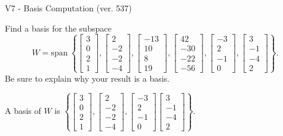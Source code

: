 \begin{exercise}
  \begin{exerciseTitle}V7 - Basis Computation (ver. 537)\end{exerciseTitle}
  \begin{exerciseStatement}
    Find a basis for the subspace 
\[W=\mathrm{span}\ \left\{\left[\begin{array}{r}
3 \\
0 \\
2 \\
1
\end{array}\right] , \left[\begin{array}{r}
2 \\
-2 \\
-2 \\
-4
\end{array}\right] , \left[\begin{array}{r}
-13 \\
10 \\
8 \\
19
\end{array}\right] , \left[\begin{array}{r}
42 \\
-30 \\
-22 \\
-56
\end{array}\right] , \left[\begin{array}{r}
-3 \\
2 \\
-1 \\
0
\end{array}\right] , \left[\begin{array}{r}
3 \\
-1 \\
-4 \\
2
\end{array}\right]\right\}.\]
 Be sure to explain why your result is a basis.


  \end{exerciseStatement}
  \begin{exerciseAnswer}
   A basis of \(W\) is  \(\left\{\left[\begin{array}{r}
3 \\
0 \\
2 \\
1
\end{array}\right] , \left[\begin{array}{r}
2 \\
-2 \\
-2 \\
-4
\end{array}\right] , \left[\begin{array}{r}
-3 \\
2 \\
-1 \\
0
\end{array}\right] \left[\begin{array}{r}
3 \\
-1 \\
-4 \\
2
\end{array}\right]\right\}\).
  


  \end{exerciseAnswer}
\end{exercise}